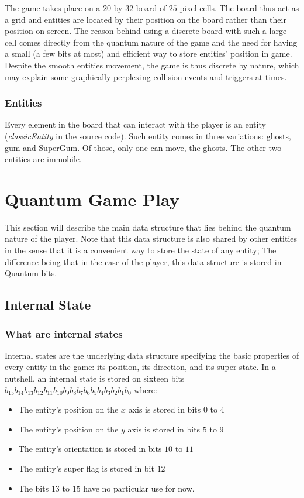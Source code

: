 \documentclass[a4paper]{article}
\begin{document}
The game takes place on a $20$ by $32$ board of $25$ pixel cells. The board thus act as a grid and entities are located by their position on the board rather than their position on screen. The reason behind using a discrete board with such a large cell comes directly from the quantum nature of the game and the need for having a small (a few bits at most) and efficient way to store entities’ position in game. Despite the smooth entities movement, the game is thus discrete by nature, which may explain some graphically perplexing collision events and triggers at times.

\subsubsection{Entities}

Every element in the board that can interact with the player is an entity (\emph{classicEntity} in the source code). Such entity comes in three variations: ghosts, gum and SuperGum. Of those, only one can move, the ghosts. The other two entities are immobile. 

\section{Quantum Game Play}

This section will describe the main data structure that lies behind the quantum nature of the player. Note that this data structure is also shared by other entities in the sense that it is a convenient way to store the state of any entity; The difference being that in the case of the player, this data structure is stored in Quantum bits.

\subsection{Internal State}

\subsubsection{What are internal states}

Internal states are the underlying data structure specifying the basic properties of every entity in the game: its position, its direction, and its super state. In a nutshell, an internal state is stored on sixteen bits $b_{15} b_{14} b_{13} b_{12} b_{11} b_{10} b_9 b_8 b_7 b_6 b_5 b_4 b_3 b_2 b_1 b_0$ where:
\begin{itemize}
\item The entity’s position on the $x$ axis is stored in bits $0$ to $4$
\item The entity’s position on the $y$ axis is stored in bits $5$ to $9$
\item The entity’s orientation is stored in bits $10$ to $11$
\item The entity’s super flag is stored in bit $12$
\item The bits $13$ to $15$ have no particular use for now.
\end{itemize}
\end{document}
